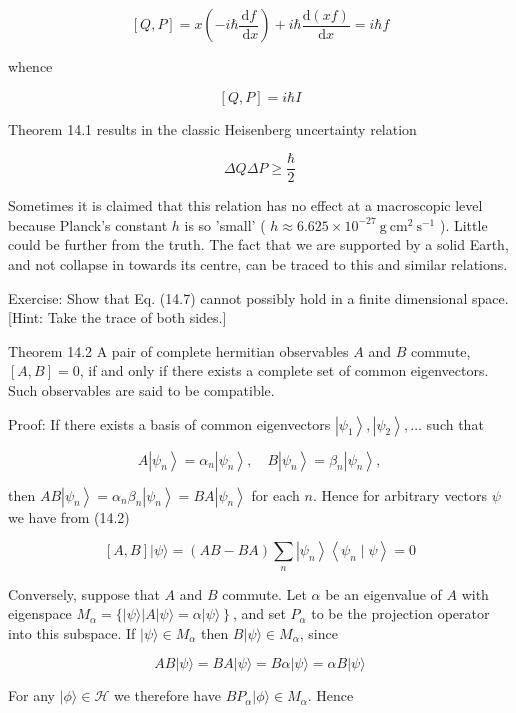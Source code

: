 \documentclass[10pt]{article}
\begin{document}
$$
[Q, P]=x\left(-i \hbar \frac{\mathrm{d} f}{\mathrm{~d} x}\right)+i \hbar \frac{\mathrm{d}(x f)}{\mathrm{d} x}=i \hbar f
$$

whence

$$
[Q, P]=i \hbar I
$$

Theorem 14.1 results in the classic Heisenberg uncertainty relation

$$
\Delta Q \Delta P \geq \frac{\hbar}{2}
$$

Sometimes it is claimed that this relation has no effect at a macroscopic level because Planck's constant $h$ is so 'small' ( $h \approx 6.625 \times 10^{-27} \mathrm{~g} \mathrm{~cm}^{2} \mathrm{~s}^{-1}$ ). Little could be further from the truth. The fact that we are supported by a solid Earth, and not collapse in towards its centre, can be traced to this and similar relations.

Exercise: Show that Eq. (14.7) cannot possibly hold in a finite dimensional space. [Hint: Take the trace of both sides.]

Theorem 14.2 A pair of complete hermitian observables $A$ and $B$ commute, $[A, B]=0$, if and only if there exists a complete set of common eigenvectors. Such observables are said to be compatible.

Proof: If there exists a basis of common eigenvectors $\left|\psi_{1}\right\rangle,\left|\psi_{2}\right\rangle, \ldots$ such that

$$
A\left|\psi_{n}\right\rangle=\alpha_{n}\left|\psi_{n}\right\rangle, \quad B\left|\psi_{n}\right\rangle=\beta_{n}\left|\psi_{n}\right\rangle,
$$

then $A B\left|\psi_{n}\right\rangle=\alpha_{n} \beta_{n}\left|\psi_{n}\right\rangle=B A\left|\psi_{n}\right\rangle$ for each $n$. Hence for arbitrary vectors $\psi$ we have from (14.2)

$$
[A, B]|\psi\rangle=(A B-B A) \sum_{n}\left|\psi_{n}\right\rangle\left\langle\psi_{n} \mid \psi\right\rangle=0
$$

Conversely, suppose that $A$ and $B$ commute. Let $\alpha$ be an eigenvalue of $A$ with eigenspace $\left.M_{\alpha}=\{|\psi\rangle|A| \psi\rangle=\alpha|\psi\rangle\right\}$, and set $P_{\alpha}$ to be the projection operator into this subspace. If $|\psi\rangle \in M_{\alpha}$ then $B|\psi\rangle \in M_{\alpha}$, since

$$
A B|\psi\rangle=B A|\psi\rangle=B \alpha|\psi\rangle=\alpha B|\psi\rangle
$$

For any $|\phi\rangle \in \mathcal{H}$ we therefore have $B P_{\alpha}|\phi\rangle \in M_{\alpha}$. Hence
\end{document}
